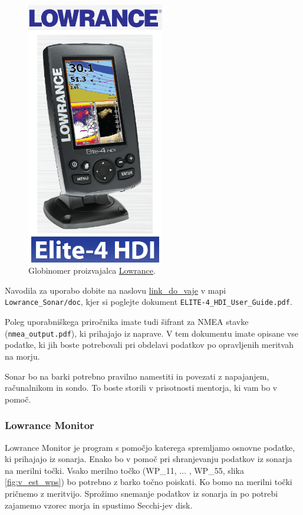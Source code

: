 \begin{figure}[!h]
	\centering \includegraphics[width=6cm]{Vaje/KartGlobSlan/figs/ES.png}
	\caption{Globinomer proizvajalca \href{http://www.lowrance.com}{Lowrance}.}
	\label{fig:v_est_es}
\end{figure}

\noindent
Navodila za uporabo dobite na naslovu \href{https://drive.google.com/open?id=0B1dT-CBA07ANQU9sOU96MDJ5b2M}{link\_do\_vaje} v mapi \texttt{Lowrance\_Sonar/doc}, kjer si poglejte dokument \texttt{ELITE-4\_HDI\_User\_Guide.pdf}.

\noindent
Poleg uporabniškega priročnika imate tudi šifrant za NMEA stavke (\texttt{nmea\_output.pdf}), ki prihajajo iz naprave. V tem dokumentu imate opisane vse podatke, ki jih boste potrebovali pri obdelavi podatkov po opravljenih meritvah na morju.

\noindent
Sonar bo na barki potrebno pravilno namestiti in povezati z napajanjem, računalnikom in sondo. To boste storili v prisotnosti mentorja, ki vam bo v pomoč.

\subsubsection{Lowrance Monitor}
Lowrance Monitor je program s pomočjo katerega spremljamo osnovne podatke, ki prihajajo iz sonarja. Enako bo v pomoč pri shranjevanju podatkov iz sonarja na merilni točki. Vsako merilno točko (WP\_11, $\ldots$ , WP\_55, slika \ref{fig:v_est_wps}) bo potrebno z barko točno poiskati. Ko bomo na merilni točki pričnemo z meritvijo. Sprožimo snemanje podatkov iz sonarja in po potrebi zajamemo vzorec morja in spustimo Secchi-jev disk.


